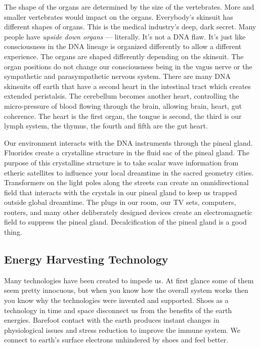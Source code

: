 The shape of the organs are determined by the size of the vertebrates.
More and smaller vertebrates would impact on the organs. Everybody's
skinsuit has different shapes of organs. This is the medical industry's
deep, dark secret. Many people have \emph{upside down organs} ---
literally. It's not a DNA flaw. It's just like consciousness in the DNA
lineage is organized differently to allow a different experience. The
organs are shaped differently depending on the skinsuit. The organ
positions do not change our consciousness being in the vagus nerve or
the sympathetic and parasympathetic nervous system. There are many DNA
skinsuits off earth that have a second heart in the intestinal tract
which creates extended peristalsis. The cerebellum becomes another
heart, controlling the micro-pressure of blood flowing through the
brain, allowing brain, heart, gut coherence. The heart is the first
organ, the tongue is second, the third is our lymph system, the thymus,
the fourth and fifth are the gut heart.

Our environment interacts with the DNA instruments through the pineal
gland. Fluorides create a crystalline structure in the fluid sac of the
pineal gland. The purpose of this crystalline structure is to take
scalar wave information from etheric satellites to influence your local
dreamtime in the sacred geometry cities. Transformers on the light poles
along the streets can create an omnidirectional field that interacts
with the crystals in our pineal gland to keep us trapped outside global
dreamtime. The plugs in our room, our TV sets, computers, routers, and
many other deliberately designed devices create an electromagnetic field
to suppress the pineal gland. Decalcification of the pineal gland is a
good thing.

\subsection{Energy Harvesting
Technology}\label{energy-harvesting-technology}

Many technologies have been created to impede us. At first glance some
of them seem pretty innocuous, but when you know how the overall system
works then you know why the technologies were invented and supported.
Shoes as a technology in time and space disconnect us from the benefits
of the earth energies. Barefoot contact with the earth produces instant
changes in physiological issues and stress reduction to improve the
immune system. We connect to earth's surface electrons unhindered by
shoes and feel better.

